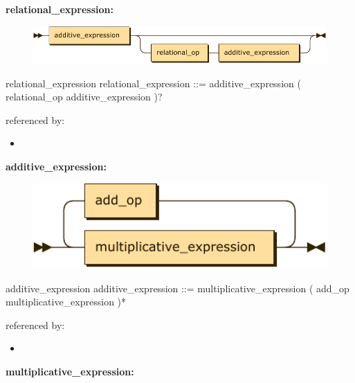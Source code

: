 \documentclass[10pt,a4paper,twoside]{article}
\providecommand{\tightlist}{%
  \setlength{\itemsep}{0pt}\setlength{\parskip}{0pt}}
\newcounter{grammarbox}[section]
\begin{document}
\textbf{relational\_expression:}

\begin{figure}[H]
\centering
\includegraphics{diagram/relational_expression.pdf}

\end{figure}

\begin{grammarbox}{relational\_expression}
\vspace{0.5em}
relational\_expression
         ::= additive\_expression ( relational\_op additive\_expression )?
\end{grammarbox}

referenced by:

\begin{itemize}
\tightlist
\item
\end{itemize}

\textbf{additive\_expression:}

\begin{figure}[H]
\centering
\includegraphics{diagram/additive_expression.pdf}

\end{figure}

\begin{grammarbox}{additive\_expression}
\vspace{0.5em}
additive\_expression
         ::= multiplicative\_expression ( add\_op multiplicative\_expression )*
\end{grammarbox}

referenced by:

\begin{itemize}
\tightlist
\item
\end{itemize}

\textbf{multiplicative\_expression:}
\end{document}
